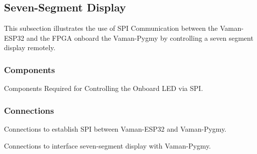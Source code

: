 \subsection{Seven-Segment Display}
This subsection illustrates the use of SPI Communication between the Vaman-ESP32
and the FPGA onboard the Vaman-Pygmy by controlling a seven segment display 
remotely.

\subsubsection{Components}
\begin{table}[!ht]
    \centering
    
    \caption{Components Required for Controlling the Onboard LED via SPI.}
    \label{tab:esp32-fpga-sevenseg-components}
\end{table}

\subsubsection{Connections}
\begin{table}[!ht]
    \centering
    
    \caption{Connections to establish SPI between Vaman-ESP32 and Vaman-Pygmy.}
    \label{tab:esp32-fpga-sevenseg-vaman-connections}
\end{table}

\begin{table}[!ht]
    \centering
    
    \caption{Connections to interface seven-segment display with Vaman-Pygmy.}
    \label{tab:esp32-fpga-sevenseg-display-connections}
\end{table}

